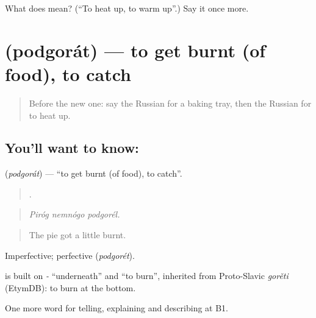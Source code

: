\begin{tcolorbox}[breakable,colback=teal!4,colframe=teal!35!black,title={Before you move on}]
What does  mean? (\textquotedblleft{}To heat up, to warm up\textquotedblright{}.) Say it once more.
\end{tcolorbox}
\section[\texorpdfstring{\ru{подгорать} (podgorát)}{подгорать (podgorát)}]{ (podgorát) — to get burnt (of food), to catch}

\label{lesson:RU-C332-podgorat}



\begin{quote}
Before the new one: say the Russian for a baking tray, then the Russian for to heat up.
\end{quote}

\subsection*{You'll want to know: }
\textbf{} (\emph{podgorát}) — \textquotedblleft{}to get burnt (of food), to catch\textquotedblright{}.

\begin{quote}
  .
\end{quote}

\begin{quote}
\emph{Piróg nemnógo podgorél.}
\end{quote}

\begin{quote}
The pie got a little burnt.
\end{quote}

Imperfective; perfective \emph{} (\emph{podgorét}).

\begin{cousinweb}
\emph{} is built on \emph{-} \textquotedblleft{}underneath\textquotedblright{} and \emph{} \textquotedblleft{}to burn\textquotedblright{}, inherited from Proto-Slavic \emph{gorěti} (EtymDB): to burn at the bottom.
\end{cousinweb}

\begin{grammarlens}[title={What you've built}]
One more word for telling, explaining and describing at B1.
\end{grammarlens}

